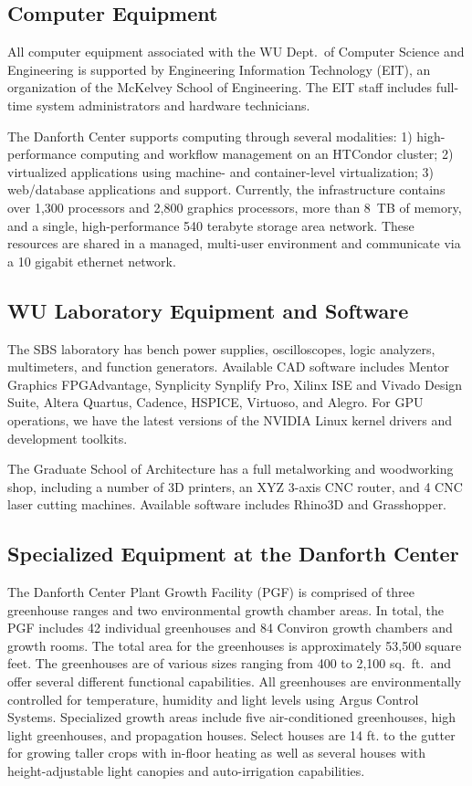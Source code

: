 \documentclass[11pt]{article}
\begin{document}
\subsection*{Computer Equipment}

All computer equipment associated with the WU Dept.\ of Computer Science
and Engineering is supported by Engineering Information Technology
(EIT), an organization of the McKelvey School of Engineering.
The EIT staff includes full-time system
administrators and hardware technicians.

The Danforth Center supports computing through several modalities: 1)
high-performance computing and workflow management on an HTCondor cluster; 2)
virtualized applications using machine- and container-level virtualization; 3)
web/database applications and support. Currently, the infrastructure contains
over 1,300 processors and 2,800 graphics processors, more than 8~TB of
memory, and a single, high-performance 540 terabyte storage area network. These
resources are shared in a managed, multi-user environment and communicate via a
10 gigabit ethernet network.

\subsection*{WU Laboratory Equipment and Software}

The SBS laboratory has bench power supplies, oscilloscopes, logic
analyzers, multimeters, and function generators.  Available CAD
software includes Mentor Graphics FPGAdvantage, Synplicity Synplify
Pro, Xilinx ISE and Vivado Design Suite, Altera Quartus, Cadence,
HSPICE, Virtuoso, and Alegro.  For GPU operations, we have the latest
versions of the NVIDIA Linux kernel drivers and development toolkits.

\vspace{0.1in}
\noindent
The Graduate School of Architecture has a full metalworking and woodworking
shop, including a number of 3D printers, an XYZ 3-axis CNC router,
and 4 CNC laser cutting machines.  Available software
includes Rhino3D and Grasshopper.

\subsection*{Specialized Equipment at the Danforth Center}

The Danforth Center Plant Growth Facility (PGF) is comprised of three
greenhouse ranges and two environmental growth chamber areas. In total, the PGF
includes 42 individual greenhouses and 84 Conviron growth chambers and growth
rooms. The total area for the greenhouses is approximately 53,500 square feet.
The greenhouses are of
various sizes ranging from 400 to 2,100 sq.~ft.~and offer several different
functional capabilities. All greenhouses are environmentally controlled for
temperature, humidity and light levels using Argus Control Systems. Specialized
growth areas include five air-conditioned greenhouses, high light greenhouses,
and propagation houses. Select houses are 14 ft. to the gutter for growing
taller crops with in-floor heating as well as several houses with
height-adjustable light canopies and auto-irrigation capabilities.
\end{document}
